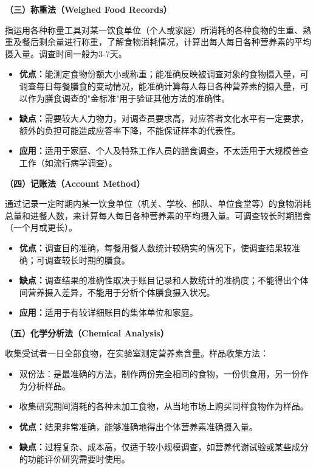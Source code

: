 \begin{defbox}
\textbf{（三）称重法（Weighed Food Records）}

指运用各种称量工具对某一饮食单位（个人或家庭）所消耗的各种食物的生重、熟重及餐后剩余量进行称重，了解食物消耗情况，计算出每人每日各种营养素的平均摄入量。调查时间一般为3-7天。

\begin{itemize}[leftmargin=*]
    \item \textbf{优点：}能测定食物份额大小或称重；能准确反映被调查对象的食物摄入量，可调查每日每餐膳食的变动情况，能准确计算每人每日各种营养素的摄入量，可以作为膳食调查的"金标准"用于验证其他方法的准确性。
    \item \textbf{缺点：}需要较大人力物力，对调查员要求高，对应答者文化水平有一定要求，额外的负担可能造成应答率下降，不能保证样本的代表性。
    \item \textbf{应用：}适用于家庭、个人及特殊工作人员的膳食调查，不太适用于大规模普查工作（如流行病学调查）。
\end{itemize}

\textbf{（四）记账法（Account Method）}

通过记录一定时期内某一饮食单位（机关、学校、部队、单位食堂等）的食物消耗总量和进餐人数，来计算每人每日各种营养素的平均摄入量。可调查较长时期膳食（一个月或更长）。

\begin{itemize}[leftmargin=*]
    \item \textbf{优点：}调查目的准确，每餐用餐人数统计较确实的情况下，使调查结果较准确；可调查较长时期的膳食。
    \item \textbf{缺点：}调查结果的准确性取决于账目记录和人数统计的准确度；不能得出个体间营养摄入差异，不能用于分析个体膳食摄入状况。
    \item \textbf{应用：}适用于有较详细账目的集体单位和家庭。
\end{itemize}

\textbf{（五）化学分析法（Chemical Analysis）}

收集受试者一日全部食物，在实验室测定营养素含量。样品收集方法：
\begin{itemize}[leftmargin=*]
    \item 双份法：是最准确的方法，制作两份完全相同的食物，一份供食用，另一份作为分析样品。
    \item 收集研究期间消耗的各种未加工食物，从当地市场上购买同样食物作为样品。
\end{itemize}
\begin{itemize}[leftmargin=*]
    \item \textbf{优点：}结果非常准确，能够准确地得出个体营养素准确摄入量。
    \item \textbf{缺点：}过程复杂、成本高，仅适于较小规模调查，如营养代谢试验或某些成分的功能评价研究需要时使用。
\end{itemize}


\end{defbox}
